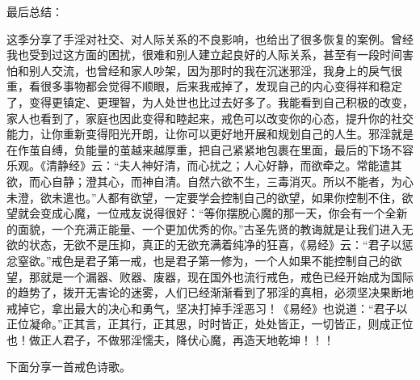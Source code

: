 最后总结：

这季分享了手淫对社交、对人际关系的不良影响，也给出了很多恢复的案例。曾经我也受到过这方面的困扰，很难和别人建立起良好的人际关系，甚至有一段时间害怕和别人交流，也曾经和家人吵架，因为那时的我在沉迷邪淫，我身上的戾气很重，看很多事物都会觉得不顺眼，后来我戒掉了，发现自己的内心变得祥和稳定了，变得更镇定、更理智，为人处世也比过去好多了。我能看到自己积极的改变，家人也看到了，家庭也因此变得和睦起来，戒色可以改变你的心态，提升你的社交能力，让你重新变得阳光开朗，让你可以更好地开展和规划自己的人生。邪淫就是在作茧自缚，负能量的茧越来越厚重，把自己紧紧地包裹在里面，最后的下场不容乐观。《清静经》云：“夫人神好清，而心扰之；人心好静，而欲牵之。常能遣其欲，而心自静；澄其心，而神自清。自然六欲不生，三毒消灭。所以不能者，为心未澄，欲未遣也。”人都有欲望，一定要学会控制自己的欲望，如果你控制不住，欲望就会变成心魔，一位戒友说得很好：“等你摆脱心魔的那一天，你会有一个全新的面貌，一个充满正能量、一个更加优秀的你。”古圣先贤的教诲就是让我们进入无欲的状态，无欲不是压抑，真正的无欲充满着纯净的狂喜，《易经》云：“君子以惩忿窒欲。”戒色是君子第一戒，也是君子第一修为，一个人如果不能控制自己的欲望，那就是一个漏器、败器、废器，现在国外也流行戒色，戒色已经开始成为国际的趋势了，拨开无害论的迷雾，人们已经渐渐看到了邪淫的真相，必须坚决果断地戒掉它，拿出最大的决心和勇气，坚决打掉手淫恶习！《易经》也说道：“君子以正位凝命。”正其言，正其行，正其思，时时皆正，处处皆正，一切皆正，则成正位也！做正人君子，不做邪淫懦夫，降伏心魔，再造天地乾坤！！！

下面分享一首戒色诗歌。

